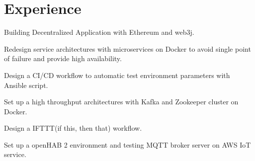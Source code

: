 \documentclass[]{deedy-resume-openfont}
\begin{document}
%
%
\lastupdated

%
%

%
%

\begin{minipage}[t]{0.45\textwidth}



\section{Experience}

\vspace{\topsep} %
\begin{tightemize}
    \item Building Decentralized Application with Ethereum and web3j.
\end{tightemize}
\sectionsep

\begin{tightemize}
    \item Redesign service architectures with microservices on Docker to avoid single point of failure and provide high availability.
    \item Design a CI/CD workflow to automatic test environment parameters with Ansible script.
    \item Set up a high throughput architectures with Kafka and Zookeeper cluster on Docker.
\end{tightemize}
\sectionsep

\begin{tightemize}
    \item Design a IFTTT(if this, then that) workflow.
    \item Set up a  openHAB 2 environment and testing MQTT broker server on AWS IoT service.
\end{tightemize}


\end{minipage}
\end{document}
